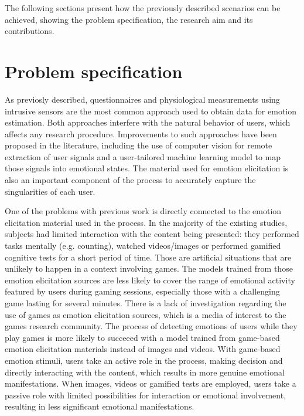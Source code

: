 
The following sections present how the previously described scenarios can be achieved, showing the problem specification, the research aim and its contributions.

\section{Problem specification}

As previosly described, questionnaires and physiological measurements using intrusive sensors are the most common approach used to obtain data for emotion estimation. Both approaches interfere with the natural behavior of users, which affects any research procedure. Improvements to such approaches have been proposed in the literature, including the use of computer vision for remote extraction of user signals and a user-tailored machine learning model to map those signals into emotional states. The material used for emotion elicitation is also an important component of the process to accurately capture the singularities of each user.

One of the problems with previous work is directly connected to the emotion elicitation material used in the process. In the majority of the existing studies, subjects had limited interaction with the content being presented: they performed tasks mentally (e.g. counting), watched videos/images or performed gamified cognitive tests for a short period of time. Those are artificial situations that are unlikely to happen in a context involving games. The models trained from those emotion elicitation sources are less likely to cover the range of emotional activity featured by users during gaming sessions, especially those with a challenging game lasting for several minutes. There is a lack of investigation regarding the use of games as emotion elicitation sources, which is a media of interest to the games research community. The process of detecting emotions of users while they play games is more likely to succeeed with a model trained from game-based emotion elicitation materials instead of images and videos. With game-based emotion stimuli, users take an active role in the process, making decision and directly interacting with the content, which results in more genuine emotional manifestations. When images, videos or gamified tests are employed, users take a passive role with limited possibilities for interaction or emotional involvement, resulting in less significant emotional manifestations.

